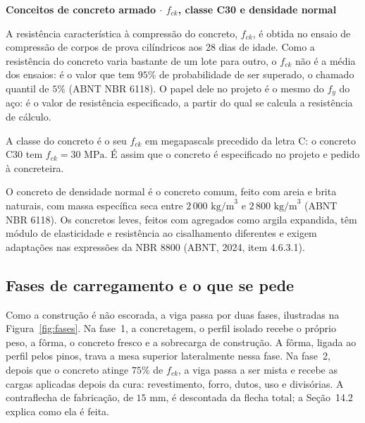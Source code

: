 \documentclass[11pt,a4paper]{article}
\newcommand{\caixaconceito}[2]{%
  \par\vspace{6pt}\noindent\colorbox{calloutbg}{%
    \parbox{\dimexpr\linewidth-2\fboxsep\relax}{%
      \vspace{4pt}\textbf{\color{primary}#1}\par\vspace{3pt}#2\vspace{4pt}%
    }%
  }\par\vspace{6pt}%
}
\begin{document}
\caixaconceito{Conceitos de concreto armado $\cdot$ $f_{ck}$, classe C30 e densidade normal}{%
A resistência característica à compressão do concreto, $f_{ck}$, é obtida no ensaio de compressão de corpos de prova cilíndricos aos 28 dias de idade. Como a resistência do concreto varia bastante de um lote para outro, o $f_{ck}$ não é a média dos ensaios: é o valor que tem $95\%$ de probabilidade de ser superado, o chamado quantil de $5\%$ (ABNT NBR 6118). O papel dele no projeto é o mesmo do $f_y$ do aço: é o valor de resistência especificado, a partir do qual se calcula a resistência de cálculo.\par\vspace{4pt}
A classe do concreto é o seu $f_{ck}$ em megapascals precedido da letra C: o concreto C30 tem $f_{ck} = 30\text{ MPa}$. É assim que o concreto é especificado no projeto e pedido à concreteira.\par\vspace{4pt}
O concreto de densidade normal é o concreto comum, feito com areia e brita naturais, com massa específica seca entre $2\,000\text{ kg/m}^3$ e $2\,800\text{ kg/m}^3$ (ABNT NBR 6118). Os concretos leves, feitos com agregados como argila expandida, têm módulo de elasticidade e resistência ao cisalhamento diferentes e exigem adaptações nas expressões da NBR 8800 (ABNT, 2024, item 4.6.3.1).}

\subsection{Fases de carregamento e o que se pede}

Como a construção é não escorada, a viga passa por duas fases, ilustradas na Figura~\ref{fig:fases}. Na fase~1, a concretagem, o perfil isolado recebe o próprio peso, a fôrma, o concreto fresco e a sobrecarga de construção. A fôrma, ligada ao perfil pelos pinos, trava a mesa superior lateralmente nessa fase. Na fase~2, depois que o concreto atinge $75\%$ de $f_{ck}$, a viga passa a ser mista e recebe as cargas aplicadas depois da cura: revestimento, forro, dutos, uso e divisórias. A contraflecha de fabricação, de $15\text{ mm}$, é descontada da flecha total; a Seção~14.2 explica como ela é feita.
\end{document}
